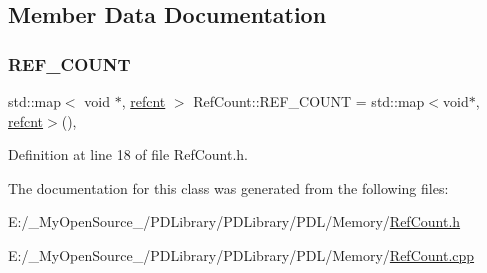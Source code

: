 \subsection{Member Data Documentation}
\mbox{\label{classpdl_1_1memory_1_1_ref_count_a8c561e2af8806d40e65e477498265302}} 
\subsubsection{\texorpdfstring{REF\_COUNT}{REF\_COUNT}}
{\footnotesize\ttfamily std\+::map$<$ void $\ast$, \mbox{\hyperlink{namespacepdl_1_1memory_a45ec9ff2bed0efb7e59d152444c867af}{refcnt}} $>$ Ref\+Count\+::\+R\+E\+F\+\_\+\+C\+O\+U\+NT = std\+::map$<$void$\ast$, \mbox{\hyperlink{namespacepdl_1_1memory_a45ec9ff2bed0efb7e59d152444c867af}{refcnt}}$>$()\hspace{0.3cm}{\ttfamily [static]}, {\ttfamily [private]}}



Definition at line 18 of file Ref\+Count.\+h.



The documentation for this class was generated from the following files\+:\begin{DoxyCompactItemize}
\item 
E\+:/\+\_\+\+My\+Open\+Source\+\_\+/\+P\+D\+Library/\+P\+D\+Library/\+P\+D\+L/\+Memory/\mbox{\hyperlink{_ref_count_8h}{Ref\+Count.\+h}}\item 
E\+:/\+\_\+\+My\+Open\+Source\+\_\+/\+P\+D\+Library/\+P\+D\+Library/\+P\+D\+L/\+Memory/\mbox{\hyperlink{_ref_count_8cpp}{Ref\+Count.\+cpp}}\end{DoxyCompactItemize}
